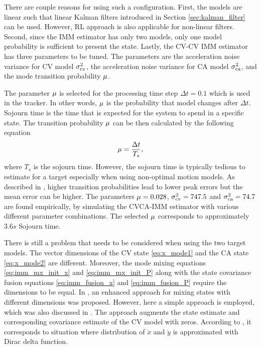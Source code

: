 \documentclass[english, 12pt, a4paper, elec, utf8, a-1b, online]{aaltothesis}
\newcommand{\dt}{\Delta t}
\begin{document}
There are couple reasons for using such a configuration.
First, the models are linear such that linear Kalman filters introduced in Section \ref{sec:kalman_filter} can be used.
However, RL approach is also applicable for non-linear filters.
Second, since the IMM estimator has only two models, only one model probability is sufficient to present the state.
Lastly, the CV-CV IMM estimator has three parameters to be tuned.
The parameters are the acceleration noise variance for CV model $\sigma_\text{cv}^2$, the acceleration noise variance for CA model $\sigma_\text{ca}^2$, and the mode transition probability $\mu$.

The parameter $\mu$ is selected for the processing time step $\dt=0.1$ which is used in the tracker.
In other words, $\mu$ is the probability that model changes after $\dt$.
Sojourn time is the time that is expected for the system to spend in a specific state.
The transition probability $\mu$ can be then calculated by the following equation
\begin{equation}
   \msp = \frac{\dt}{T_s},
\end{equation}
where $T_s$ is the sojourn time.
However, the sojourn time is typically tedious to estimate for a target especially when using non-optimal motion models.
As described in \cite{Simeonova2002}, higher transition probabilities lead to lower peak errors but the mean error can be higher.
The parameters $\mu=0.028$, $\sigma_\text{cv}^2=747.5$ and $\sigma_\text{ca}^2=74.7$ are found empirically, by simulating the CVCA-IMM estimator with various different parameter combinations.
The selected $\mu$ corresponds to approximately $3.6s$ Sojourn time.

There is still a problem that needs to be considered when using the two target models.
The vector dimensions of the CV state \eqref{eq:x_mode1} and the CA state \eqref{eq:x_mode2} are different. 
Moreover, the mode mixing equations \eqref{eq:imm_mx_init_x} and \eqref{eq:imm_mx_init_P} along with the state covariance fusion equations \eqref{eq:imm_fusion_x} and \eqref{eq:imm_fusion_P} require the dimensions to be equal.
In \cite{Granstroem2015}, an enhanced approach for mixing states with different dimensions was proposed.
However, here a simple approach is employed, which was also discussed in \cite{Granstroem2015}.
The approach augments the state estimate and corresponding covariance estimate of the CV model with zeros.
According to \cite{Granstroem2015}, it corresponds to situation where distribution of $\ddot{x}$ and $\ddot{y}$
is approximated with Dirac delta function.
\end{document}
